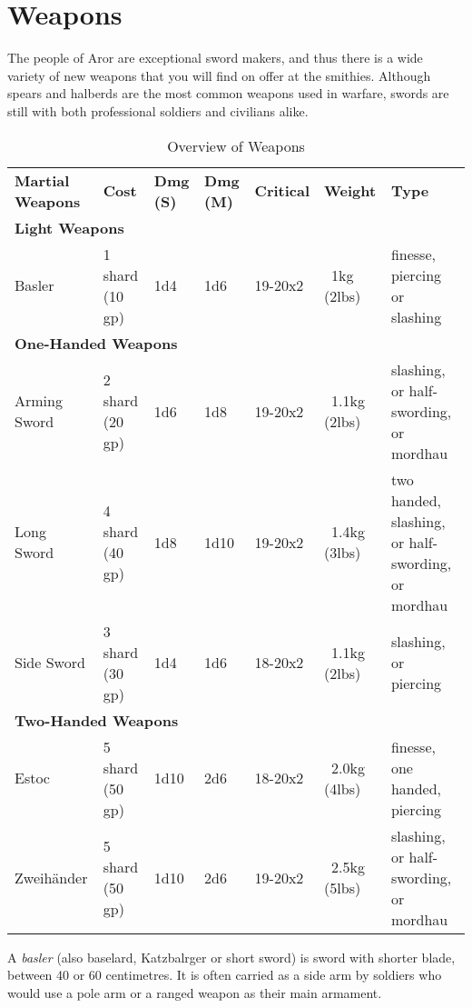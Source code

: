 \section{Weapons}
\label{sec:Weapons}

The people of Aror are exceptional sword makers, and thus there is a wide
variety of new weapons that you will find on offer at the smithies. Although
spears and halberds are the most common weapons used in warfare, swords are
still with both professional soldiers and civilians alike.

\begin{table*}[!htb]
  \caption{Overview of Weapons}
  \begin{tabular}{p{2.5cm}     l               p{1cm}             p{1cm}             p{1.5cm}            p{2cm}          p{3.0cm}}
    \textbf{Martial Weapons} & \textbf{Cost} & \textbf{Dmg (S)} & \textbf{Dmg (M)} & \textbf{Critical} & \textbf{Weight} & \textbf{Type} \\
    \multicolumn{7}{l}{\large{\textbf{Light Weapons}}} \\
    Basler       & 1 shard (10 gp) & 1d4  & 1d6  & 19-20x2 & ~1kg (2lbs)   & finesse, piercing or slashing \\
    \multicolumn{7}{l}{\large{\textbf{One-Handed Weapons}}} \\
    Arming Sword & 2 shard (20 gp) & 1d6  & 1d8  & 19-20x2 & ~1.1kg (2lbs) & slashing, or half-swording, or mordhau \\
    Long Sword   & 4 shard (40 gp) & 1d8  & 1d10 & 19-20x2 & ~1.4kg (3lbs) & two handed, slashing, or half-swording, or mordhau \\
    Side Sword   & 3 shard (30 gp) & 1d4  & 1d6  & 18-20x2 & ~1.1kg (2lbs) & slashing, or piercing \\
    \multicolumn{7}{l}{\large{\textbf{Two-Handed Weapons}}} \\
    Estoc        & 5 shard (50 gp) & 1d10 & 2d6  & 18-20x2 & ~2.0kg (4lbs) & finesse, one handed, piercing \\
    Zweihänder   & 5 shard (50 gp) & 1d10 & 2d6  & 19-20x2 & ~2.5kg (5lbs) & slashing, or half-swording, or mordhau \\
  \end{tabular}
\end{table*}

A \emph{basler} (also baselard, Katzbalrger or short sword) is sword with
shorter blade, between 40 or 60 centimetres. It is often carried as a side arm
by soldiers who would use a pole arm or a ranged weapon as their main
armament.

